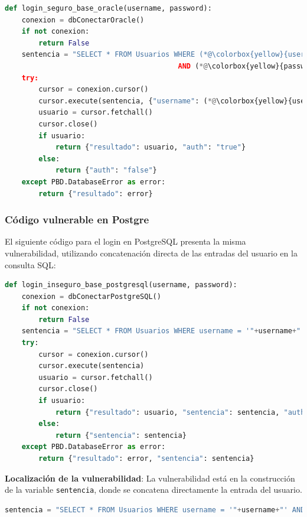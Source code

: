 \documentclass[a4paper,12pt]{article}
\begin{document}
\begin{lstlisting}[language=Python]
def login_seguro_base_oracle(username, password):
    conexion = dbConectarOracle()
    if not conexion:
        return False
    sentencia = "SELECT * FROM Usuarios WHERE (*@\colorbox{yellow}{username = :username}@*)
                                         AND (*@\colorbox{yellow}{password = :password}@*)"
    try:
        cursor = conexion.cursor()
        cursor.execute(sentencia, {"username": (*@\colorbox{yellow}{username}@*), "password": (*@\colorbox{yellow}{password}@*)})
        usuario = cursor.fetchall()
        cursor.close()
        if usuario:
            return {"resultado": usuario, "auth": "true"}
        else:
            return {"auth": "false"}
    except PBD.DatabaseError as error:
        return {"resultado": error}
\end{lstlisting}

\subsubsection{Código vulnerable en Postgre}

El siguiente código para el login en PostgreSQL presenta la misma vulnerabilidad, utilizando concatenación directa de las entradas del usuario en la consulta SQL:

\begin{lstlisting}[language=Python]
def login_inseguro_base_postgresql(username, password):
    conexion = dbConectarPostgreSQL()
    if not conexion:
        return False
    sentencia = "SELECT * FROM Usuarios WHERE username = '"+username+"' AND password = '"+password+"'"
    try:
        cursor = conexion.cursor()
        cursor.execute(sentencia)
        usuario = cursor.fetchall()
        cursor.close()
        if usuario:
            return {"resultado": usuario, "sentencia": sentencia, "auth": "true"}
        else:
            return {"sentencia": sentencia}
    except PBD.DatabaseError as error:
        return {"resultado": error, "sentencia": sentencia}
\end{lstlisting}

\textbf{Localización de la vulnerabilidad}: La vulnerabilidad está en la construcción de la variable \texttt{sentencia}, donde se concatena directamente la entrada del usuario.

\begin{lstlisting}[language=Python]
sentencia = "SELECT * FROM Usuarios WHERE username = '"+username+"' AND password = '"+password+"'"
\end{lstlisting}
\end{document}
